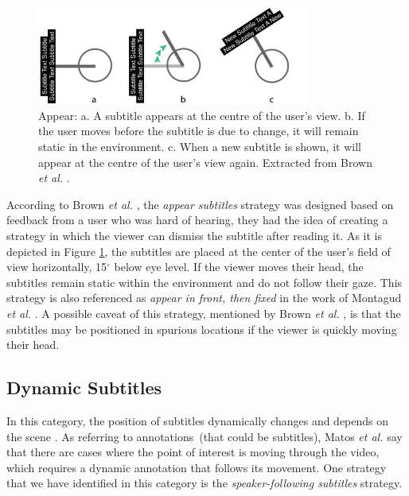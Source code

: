 \begin{figure}[!ht]
    \centering
    \includegraphics[width=0.8\textwidth]{img/video360/appear.png}
    \caption{Appear: a. A subtitle appears at the centre of the user's view. b. If the user moves before the subtitle is due to change, it will remain static in the environment. c. When a new subtitle is shown, it will appear at the centre of the user's view again. Extracted from Brown \emph{et al.} \cite{brown_subtitles_2017}.}
    \label{fig:appear_subtitle}
\end{figure}

According to Brown \emph{et al.} \cite{brown_subtitles_2017}, the \emph{appear subtitles} strategy was designed based on feedback from a user who was hard of hearing, they had the idea of creating a strategy in which the viewer can dismiss the subtitle after reading it. As it is depicted in Figure \ref{fig:appear_subtitle}, the subtitles are placed at the center of the user's field of view horizontally, 15$^{\circ}$ below eye level. If the viewer moves their head, the subtitles remain static within the environment and do not follow their gaze. This strategy is also referenced as \emph{appear in front, then fixed} in the work of Montagud \emph{et al.} \cite{montagud_culture_2020}. A possible caveat of this strategy, mentioned by Brown \emph{et al.} \cite{brown_subtitles_2017}, is that the subtitles may be positioned in spurious locations if the viewer is quickly moving their head.

\subsection{Dynamic Subtitles}
\label{subsection:dynamic_subtitles}

In this category, the position of subtitles dynamically changes and depends on the scene \cite{rothe_dynamic_2018}. As referring to annotations~(that could be subtitles), Matos \emph{et al.} \cite{matos_dynamic_2018} say that there are cases where the point of interest is moving through the video, which requires a dynamic annotation that follows its movement. One strategy that we have identified in this category is the \emph{speaker-following subtitles} strategy.

